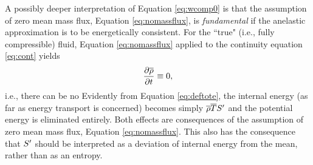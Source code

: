 \documentclass[12pt]{article}
\begin{document}
A possibly deeper interpretation of Equation \eqref{eq:wcomp0} is that the assumption of zero mean mass flux, Equation \eqref{eq:nomassflux}, is \textit{fundamental} if the anelastic approximation is to be energetically consistent. For the ``true" (i.e., fully compressible) fluid, Equation \eqref{eq:nomassflux} applied to the continuity equation \eqref{eq:cont} yields
\begin{align}
	\frac{\partial\overline{\rho}}{\partial t}\equiv0,
\end{align}
i.e., there can be no
Evidently from Equation \eqref{eq:deftote}, the internal energy (as far as energy transport is concerned) becomes simply $\overline{\rho}\overline{T} {S^\prime}$ and the potential energy is eliminated entirely. Both effects are consequences of the assumption of zero mean mass flux, Equation \eqref{eq:nomassflux}. This also has the consequence that ${S^\prime}$ should be interpreted as a deviation of internal energy from the mean, rather than as an entropy. 

\end{document}

